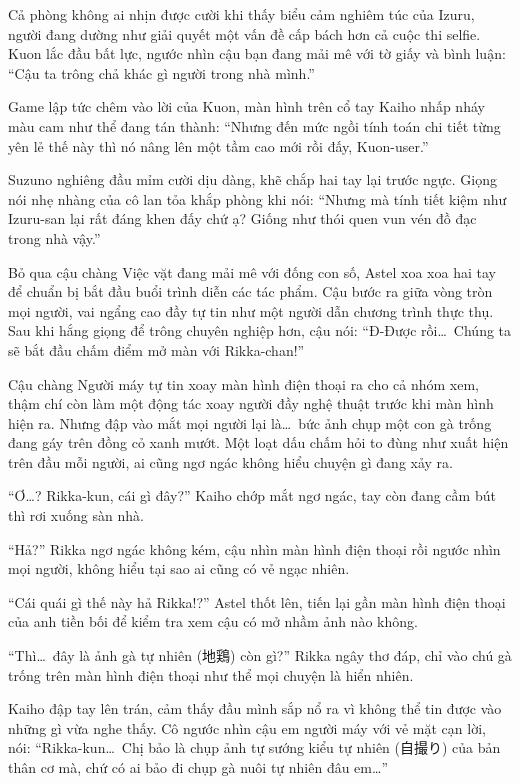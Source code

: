 \documentclass[../main.tex]{subfiles}
\begin{document}
Cả phòng không ai nhịn được cười khi thấy biểu cảm nghiêm túc của Izuru, người đang dường như giải quyết một vấn đề cấp bách hơn cả cuộc thi selfie. Kuon lắc đầu bất lực, ngước nhìn cậu bạn đang mải mê với tờ giấy và bình luận: ``Cậu ta trông chả khác gì người trong nhà mình.''

Game lập tức chêm vào lời của Kuon, màn hình trên cổ tay Kaiho nhấp nháy màu cam như thể đang tán thành: ``Nhưng đến mức ngồi tính toán chi tiết từng yên lẻ thế này thì nó nâng lên một tầm cao mới rồi đấy, Kuon-user.''

Suzuno nghiêng đầu mỉm cười dịu dàng, khẽ chắp hai tay lại trước ngực. Giọng nói nhẹ nhàng của cô lan tỏa khắp phòng khi nói: ``Nhưng mà tính tiết kiệm như Izuru-san lại rất đáng khen đấy chứ ạ? Giống như thói quen vun vén đồ đạc trong nhà vậy.''

Bỏ qua cậu chàng Việc vặt đang mải mê với đống con số, Astel xoa xoa hai tay để chuẩn bị bắt đầu buổi trình diễn các tác phẩm. Cậu bước ra giữa vòng tròn mọi người, vai ngẩng cao đầy tự tin như một người dẫn chương trình thực thụ. Sau khi hắng giọng để trông chuyên nghiệp hơn, cậu nói: ``Đ-Được rồi\dots\ Chúng ta sẽ bắt đầu chấm điểm mở màn với Rikka-chan!''

Cậu chàng Người máy tự tin xoay màn hình điện thoại ra cho cả nhóm xem, thậm chí còn làm một động tác xoay người đầy nghệ thuật trước khi màn hình hiện ra. Nhưng đập vào mắt mọi người lại là\dots\ bức ảnh chụp một con gà trống đang gáy trên đồng cỏ xanh mướt. Một loạt dấu chấm hỏi to đùng như xuất hiện trên đầu mỗi người, ai cũng ngơ ngác không hiểu chuyện gì đang xảy ra.


``Ơ\dots? Rikka-kun, cái gì đây?'' Kaiho chớp mắt ngơ ngác, tay còn đang cầm bút thì rơi xuống sàn nhà.

``Hả?'' Rikka ngơ ngác không kém, cậu nhìn màn hình điện thoại rồi ngước nhìn mọi người, không hiểu tại sao ai cũng có vẻ ngạc nhiên.

``Cái quái gì thế này hả Rikka!?'' Astel thốt lên, tiến lại gần màn hình điện thoại của anh tiền bối để kiểm tra xem cậu có mở nhầm ảnh nào không.

``Thì\dots\ đây là ảnh gà tự nhiên (地鶏) còn gì?'' Rikka ngây thơ đáp, chỉ vào chú gà trống trên màn hình điện thoại như thể mọi chuyện là hiển nhiên.

Kaiho đập tay lên trán, cảm thấy đầu mình sắp nổ ra vì không thể tin được vào những gì vừa nghe thấy. Cô ngước nhìn cậu em người máy với vẻ mặt cạn lời, nói: ``Rikka-kun\dots\ Chị bảo là chụp ảnh tự sướng kiểu tự nhiên (自撮り) của bản thân cơ mà, chứ có ai bảo đi chụp gà nuôi tự nhiên đâu em\dots''
\end{document}
